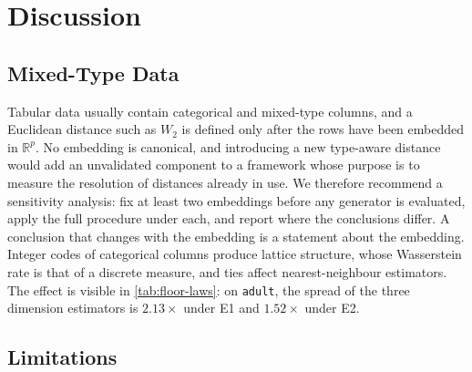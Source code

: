 \documentclass[twoside,11pt]{article}
\theoremstyle{plain}
\theoremstyle{definition}
\theoremstyle{remark}
\newcommand{\Wtwo}{\ensuremath{W_2}}
\newcommand{\R}{\ensuremath{\mathbb{R}}}
\begin{document}
\section{Discussion}\label{sec:discussion}

\subsection{Mixed-Type Data}\label{sec:discussion-mixed}

Tabular data usually contain categorical and mixed-type columns, and a
Euclidean distance such as $\Wtwo$ is defined only after the rows have been
embedded in $\R^{p}$. No embedding is canonical, and introducing a new
type-aware distance would add an unvalidated component to a framework whose
purpose is to measure the resolution of distances already in use. We
therefore recommend a sensitivity analysis: fix at least two embeddings
before any generator is evaluated, apply the full procedure under each, and
report where the conclusions differ. A conclusion that changes with the
embedding is a statement about the embedding. Integer codes of categorical
columns produce lattice structure, whose Wasserstein rate is that of a
discrete measure, and ties affect nearest-neighbour estimators. The effect
is visible in \cref{tab:floor-laws}: on \texttt{adult}, the spread of the three
dimension estimators is $2.13\times$ under E1 and $1.52\times$ under E2.

\subsection{Limitations}\label{sec:discussion-limits}
\end{document}
